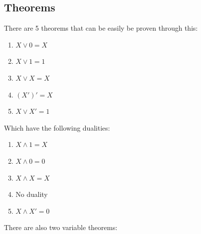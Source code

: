 \documentclass[nobib]{tufte-handout}
\begin{document}
\subsection{Theorems}
There are 5 theorems that can be easily be proven through this:
\begin{enumerate}
    \item $X\lor 0=X$
    \item $X \lor 1 = 1$
    \item $X \lor X = X$
    \item $(X')'=X$
    \item $X\lor X' = 1$
\end{enumerate}
Which have the following dualities:
\begin{enumerate}
    \item $X\land 1 =X$
    \item $X\land 0 = 0$
    \item $X \land X = X$
    \item No duality
    \item $X\land X' = 0$
\end{enumerate}
There are also two variable theorems:
\end{document}
